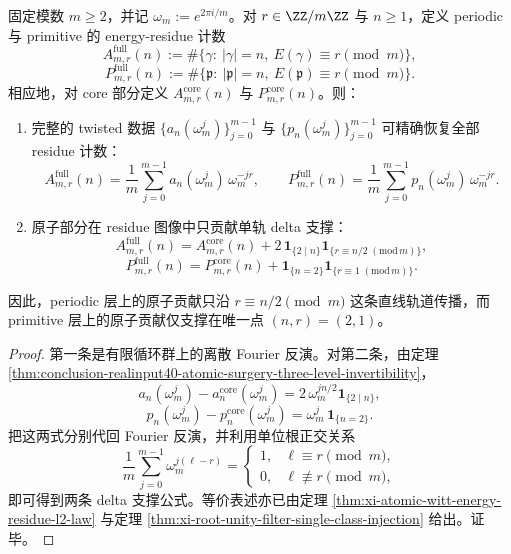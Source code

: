 \begin{theorem}\label{thm:conclusion-realinput40-residue-fourier-recovery-delta-trajectory}
固定模数 \(m\ge 2\)，并记 \(\omega_m:=e^{2\pi i/m}\)。对 \(r\in \ZZ/m\ZZ\) 与 \(n\ge 1\)，定义 periodic 与 primitive 的 energy-residue 计数
\[
A_{m,r}^{\mathrm{full}}(n)
:=
\#\{\gamma:\ |\gamma|=n,\ E(\gamma)\equiv r\pmod m\},
\]
\[
P_{m,r}^{\mathrm{full}}(n)
:=
\#\{\mathfrak p:\ |\mathfrak p|=n,\ E(\mathfrak p)\equiv r\pmod m\}.
\]
相应地，对 core 部分定义 \(A_{m,r}^{\mathrm{core}}(n)\) 与 \(P_{m,r}^{\mathrm{core}}(n)\)。则：
\begin{enumerate}
  \item 完整的 twisted 数据 \(\{a_n(\omega_m^j)\}_{j=0}^{m-1}\) 与 \(\{p_n(\omega_m^j)\}_{j=0}^{m-1}\) 可精确恢复全部 residue 计数：
  \[
  \boxed{\;
  A_{m,r}^{\mathrm{full}}(n)
  =
  \frac1m\sum_{j=0}^{m-1}a_n(\omega_m^j)\,\omega_m^{-jr},\qquad
  P_{m,r}^{\mathrm{full}}(n)
  =
  \frac1m\sum_{j=0}^{m-1}p_n(\omega_m^j)\,\omega_m^{-jr}.\;}
  \]
  \item 原子部分在 residue 图像中只贡献单轨 delta 支撑：
  \[
  \boxed{\;
  A_{m,r}^{\mathrm{full}}(n)
  =
  A_{m,r}^{\mathrm{core}}(n)
  +
  2\,\mathbf 1_{\{2\mid n\}}\mathbf 1_{\{r\equiv n/2\;(\mathrm{mod}\,m)\}},\;}
  \]
  \[
  \boxed{\;
  P_{m,r}^{\mathrm{full}}(n)
  =
  P_{m,r}^{\mathrm{core}}(n)
  +
  \mathbf 1_{\{n=2\}}\mathbf 1_{\{r\equiv 1\;(\mathrm{mod}\,m)\}}.\;}
  \]
\end{enumerate}
因此，periodic 层上的原子贡献只沿 \(r\equiv n/2\pmod m\) 这条直线轨道传播，而 primitive 层上的原子贡献仅支撑在唯一点 \((n,r)=(2,1)\)。
\end{theorem}
\begin{proof}
第一条是有限循环群上的离散 Fourier 反演。对第二条，由定理 \ref{thm:conclusion-realinput40-atomic-surgery-three-level-invertibility}，
\[
a_n(\omega_m^j)-a_n^{\mathrm{core}}(\omega_m^j)
=
2\,\omega_m^{j n/2}\mathbf 1_{\{2\mid n\}},
\]
\[
p_n(\omega_m^j)-p_n^{\mathrm{core}}(\omega_m^j)
=
\omega_m^j\,\mathbf 1_{\{n=2\}}.
\]
把这两式分别代回 Fourier 反演，并利用单位根正交关系
\[
\frac1m\sum_{j=0}^{m-1}\omega_m^{j(\ell-r)}
=
\begin{cases}
1,& \ell\equiv r\pmod m,\\
0,& \ell\not\equiv r\pmod m,
\end{cases}
\]
即可得到两条 delta 支撑公式。等价表述亦已由定理 \ref{thm:xi-atomic-witt-energy-residue-l2-law} 与定理 \ref{thm:xi-root-unity-filter-single-class-injection} 给出。证毕。
\end{proof}

